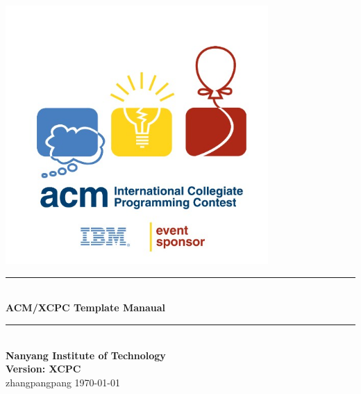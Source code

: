 \documentclass[a4paper]{book}
\newcommand{\HRule}{\rule{\linewidth}{0.5mm}}
\begin{document}
    \begin{titlepage}
        \begin{center}
            \vspace*{0.0cm}\includegraphics[width=0.75\textwidth]{../photo/ACM_logo.jpg} \\ [0cm]
            \HRule \\ [1cm]
            \textbf{\Huge{ACM/XCPC Template Manaual}} \\ [0.5cm]
            \HRule \\ [4cm]
            \textbf{\Huge{Nanyang Institute of Technology}} \\ [1cm]
            \textbf{\LARGE{Version: XCPC}} \\ [1cm]
            \LARGE{zhangpangpang}
            \vfill
            \Large{\today}
        \end{center}
        \clearpage
    \end{titlepage}
    \tableofcontents
    \newpage
    

    \renewcommand{\chaptermark}[1]{\markboth{#1}{}}
    \renewcommand{\sectionmark}[1]{\markright{\thesection\ #1}}
    \fancyhf{}
    \fancyfoot[C]{\bfseries\thepage}
    \fancyhead[LO]{\bfseries\rightmark}
    \fancyhead[RE]{\bfseries\leftmark}
    \renewcommand{\headrulewidth}{0.4pt} %
    \renewcommand{\footrulewidth}{0pt}

    \setcounter{section}{0}
    \setcounter{page}{1}

    \def\allfiles{}
\end{document}
